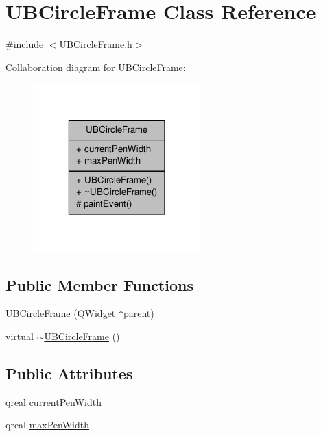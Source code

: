 \hypertarget{class_u_b_circle_frame}{\section{U\-B\-Circle\-Frame Class Reference}
\label{dc/d2d/class_u_b_circle_frame}
}


{\ttfamily \#include $<$U\-B\-Circle\-Frame.\-h$>$}



Collaboration diagram for U\-B\-Circle\-Frame\-:
\nopagebreak
\begin{figure}[H]
\begin{center}
\leavevmode
\includegraphics[width=184pt]{da/d51/class_u_b_circle_frame__coll__graph}
\end{center}
\end{figure}
\subsection*{Public Member Functions}
\begin{DoxyCompactItemize}
\item 
\hyperlink{class_u_b_circle_frame_aa85bfc38f235811abe224d47cb9dfc00}{U\-B\-Circle\-Frame} (Q\-Widget $\ast$parent)
\item 
virtual \hyperlink{class_u_b_circle_frame_a8db677bf361cc9d888645f7869dae76e}{$\sim$\-U\-B\-Circle\-Frame} ()
\end{DoxyCompactItemize}
\subsection*{Public Attributes}
\begin{DoxyCompactItemize}
\item 
qreal \hyperlink{class_u_b_circle_frame_a21ae21c1c7f5ba4966d5fe17f1504502}{current\-Pen\-Width}
\item 
qreal \hyperlink{class_u_b_circle_frame_a1f05aa43c60573f1db992632044b86a7}{max\-Pen\-Width}
\end{DoxyCompactItemize}
